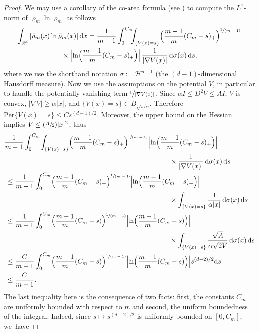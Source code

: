 \documentclass[10pt]{amsart}
\newcommand{\Psfrac}[2]{(\sfrac{#1}{#2})}
\newcommand{\spfrac}[2]{\sfrac{#1}{(#2)}}
\newcommand{\Bprt}[1]{\Bigl(#1\Bigr)}
\newcommand{\dx}[1]{\mathop{}\!\mathrm{d} #1}
\newcommand{\R}{\mathbb{R}}
\theoremstyle{plain}
\theoremstyle{remark}
\begin{document}
\begin{proof}
We may use a corollary of the co-area formula (see \cite[\S 3.4.4, Prop.\,3]{EvaGar}) to compute the $L^1$-norm of $\bar\varrho_m \ln \bar\varrho_m$ as follows
\begin{multline*}
\int_{\R^d} |\bar\varrho_m(x) \ln \bar\varrho_m(x)| \dx x
= \frac{1}{m-1}\int_0^{C_m}\!\!\! \int_{\{V(x)={s}\}}\Bprt{\frac{m-1}{m}(C_m -{s})_+}^{\spfrac{1}{m-1}}\\
{}\times\Bigl|\ln \Bprt{\frac{m-1}{m}(C_m -{s})_+} \Bigr|\,\frac{1}{|\nabla V(x)|} \dx{\sigma(x)} \dx {s},
\end{multline*}
where we use the shorthand notation $\sigma:=\mathcal{H}^{d-1}$ (the $(d-1)$-dimensional Hausdorff measure).
Now we use the assumptions on the potential $V$, in particular to handle the potentially vanishing term $\sfrac{1}{|\nabla V(x)|}$. Since $\alpha I \leq D^2 V\leq A I$, $V$ is convex, $|\nabla V|\geq \alpha |x|$, and $\{V(x)={s}\}\subset B_{\sqrt{{s}/\alpha}}$. Therefore $\mathrm{Per}\{V(x)={s}\} \leq C {s}^{(d-1)/2}$. Moreover, the upper bound on the Hessian implies $V\leq \Psfrac A 2 |x|^2$, thus
\begin{align*}
& \frac{1}{m-1}\int_0^{C_m}\! \int_{\{V(x)={s}\}} \Bprt{\frac{m-1}{m}(C_m -{s})_+}^{\spfrac{1}{m-1}} \Bigl|\ln \Bprt{\frac{m-1}{m}(C_m -{s})_+} \Bigr|\\
&\hspace*{8.5cm}{}\times\frac{1}{|\nabla V(x)|} \dx{\sigma(x)} \dx {s} \\
&\:\leq \frac{1}{m-1}\int_0^{C_m} \Bprt{\frac{m-1}{m}(C_m -{s})_+}^{\spfrac{1}{m-1}} \Bigl|\ln \Bprt{\frac{m-1}{m}(C_m -{s})_+} \Bigr|\\
&\hspace*{8.5cm}{}\times \int_{\{V(x)={s}\}} \frac{1}{\alpha |x|} \dx{\sigma(x)}\dx {s}\\
&\:\leq \frac{1}{m-1}\int_0^{C_m} \Bprt{\frac{m-1}{m}(C_m -{s})}^{\spfrac{1}{m-1}} \Bigl|\ln \Bprt{\frac{m-1}{m}(C_m -{s})} \Bigr|\\
&\hspace*{8.5cm}{}\times\int_{\{V(x)={s}\}} \frac{\sqrt{A }}{\alpha\sqrt{2{V}}}\dx{\sigma(x)}\dx {s}\\
&\:\leq \frac{C}{m-1}\int_0^{C_m} \Bprt{\frac{m-1}{m}(C_m -{s})}^{\spfrac{1}{m-1}} \Bigl|\ln \Bprt{\frac{m-1}{m}(C_m -{s})} \Bigr| {s}^{(d-2)/2} {\dx {s}}\\
&\:\leq \frac{C}{m-1}.
\end{align*}
The last inequality here is the consequence of two facts: first, the constants $C_{m}$ are uniformly bounded with respect to $m$ and second, the uniform boundedness of the integral. Indeed, since $s\mapsto s^{(d-2)/2}$ is uniformly bounded on $[0,C_{m}]$, we~have

\end{proof}
\end{document}
